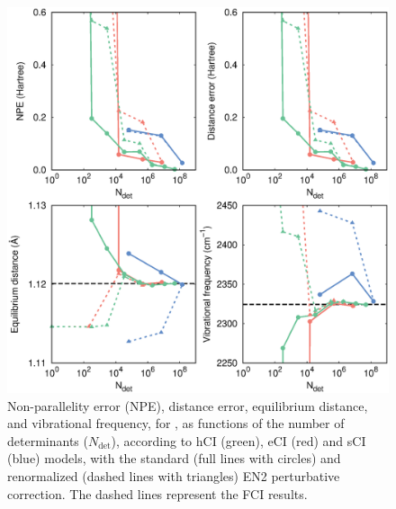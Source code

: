 \documentclass[aip,jcp,preprint,noshowkeys,superscriptaddress]{revtex4-1}
\newcommand{\Ndet}{N_\text{det}}
\begin{document}
\begin{figure}%
\includegraphics[width=1.0\linewidth]{plot_pt2_rpt2_N2}
\caption{
Non-parallelity error (NPE), distance error, equilibrium distance, and vibrational frequency, for ,
as functions of the number of determinants ($\Ndet$), according to hCI (green), eCI (red) and sCI (blue) models,
with the standard (full lines with circles) and renormalized (dashed lines with triangles) EN2 perturbative correction.
The dashed lines represent the FCI results.}
\label{fig:plot_pt2_rpt2_n2}
\end{figure}
\end{document}
